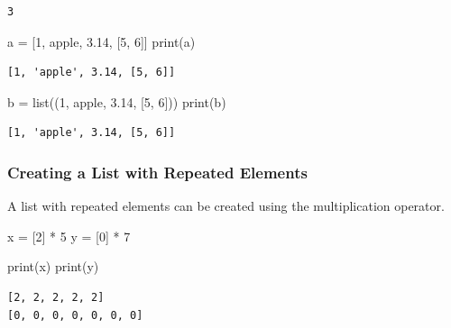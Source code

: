 \documentclass[
  letterpaper,
  DIV=11,
  numbers=noendperiod]{scrreprt}
\newenvironment{Shaded}{\begin{snugshade}}{\end{snugshade}}
\newcommand{\BuiltInTok}[1]{\textcolor[rgb]{0.00,0.23,0.31}{#1}}
\newcommand{\DecValTok}[1]{\textcolor[rgb]{0.68,0.00,0.00}{#1}}
\newcommand{\FloatTok}[1]{\textcolor[rgb]{0.68,0.00,0.00}{#1}}
\newcommand{\NormalTok}[1]{\textcolor[rgb]{0.00,0.23,0.31}{#1}}
\newcommand{\OperatorTok}[1]{\textcolor[rgb]{0.37,0.37,0.37}{#1}}
\newcommand{\StringTok}[1]{\textcolor[rgb]{0.13,0.47,0.30}{#1}}
\begin{document}
\begin{verbatim}
3
\end{verbatim}

\begin{Shaded}
\begin{Highlighting}[]
\NormalTok{a }\OperatorTok{=}\NormalTok{ [}\DecValTok{1}\NormalTok{, }\StringTok{\textquotesingle{}apple\textquotesingle{}}\NormalTok{, }\FloatTok{3.14}\NormalTok{, [}\DecValTok{5}\NormalTok{, }\DecValTok{6}\NormalTok{]]}
\BuiltInTok{print}\NormalTok{(a)}
\end{Highlighting}
\end{Shaded}

\begin{verbatim}
[1, 'apple', 3.14, [5, 6]]
\end{verbatim}

\begin{Shaded}
\begin{Highlighting}[]
\NormalTok{b }\OperatorTok{=} \BuiltInTok{list}\NormalTok{((}\DecValTok{1}\NormalTok{, }\StringTok{\textquotesingle{}apple\textquotesingle{}}\NormalTok{, }\FloatTok{3.14}\NormalTok{, [}\DecValTok{5}\NormalTok{, }\DecValTok{6}\NormalTok{]))}
\BuiltInTok{print}\NormalTok{(b)}
\end{Highlighting}
\end{Shaded}

\begin{verbatim}
[1, 'apple', 3.14, [5, 6]]
\end{verbatim}

\subsubsection{Creating a List with Repeated
Elements}\label{creating-a-list-with-repeated-elements}

A list with repeated elements can be created using the multiplication
operator.

\begin{Shaded}
\begin{Highlighting}[]
\NormalTok{x }\OperatorTok{=}\NormalTok{ [}\DecValTok{2}\NormalTok{] }\OperatorTok{*} \DecValTok{5}
\NormalTok{y }\OperatorTok{=}\NormalTok{ [}\DecValTok{0}\NormalTok{] }\OperatorTok{*} \DecValTok{7}

\BuiltInTok{print}\NormalTok{(x)}
\BuiltInTok{print}\NormalTok{(y)}
\end{Highlighting}
\end{Shaded}

\begin{verbatim}
[2, 2, 2, 2, 2]
[0, 0, 0, 0, 0, 0, 0]
\end{verbatim}
\end{document}
